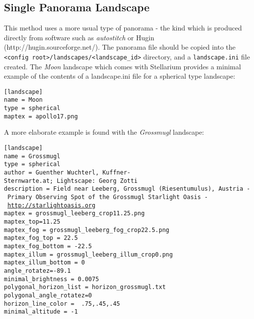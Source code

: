 \subsection{Single Panorama Landscape}\label{single-panorama-method}

This method uses a more usual type of panorama - the kind which is
produced directly from software such as \emph{autostitch} or Hugin
(http://hugin.sourceforge.net/). The panorama file should be copied into
the
\texttt{\textless{}config\ root\textgreater{}/landscapes/\textless{}landscape\_id\textgreater{}}
directory, and a \texttt{landscape.ini} file created. The \emph{Moon}
landscape which comes with Stellarium provides a minimal example of the
contents of a landscape.ini file for a spherical type landscape:

\begin{config}
\texttt{{[}landscape{]}}\\
\texttt{name~=~Moon}\\
\texttt{type~=~spherical}\\
\texttt{maptex~=~apollo17.png}
\end{config}

A more elaborate example is found with the \emph{Grossmugl} landscape:

\begin{config}
\texttt{{[}landscape{]}}\\
\texttt{name~=~Grossmugl}\\
\texttt{type~=~spherical}\\
\texttt{author~=~Guenther~Wuchterl,~Kuffner-Sternwarte.at;~Lightscape:~Georg~Zotti}\\
\texttt{description~=~Field~near~Leeberg,~Grossmugl~(Riesentumulus),~Austria~-~Primary~Observing~Spot~of~the~Grossmugl~Starlight~Oasis~-~}\href{http://starlightoasis.org}{\texttt{http://starlightoasis.org}}\\
\texttt{maptex~=~grossmugl\_leeberg\_crop11.25.png}\\
\texttt{maptex\_top=11.25~}\\
\texttt{maptex\_fog~=~grossmugl\_leeberg\_fog\_crop22.5.png}\\
\texttt{maptex\_fog\_top~=~22.5}\\
\texttt{maptex\_fog\_bottom~=~-22.5}\\
\texttt{maptex\_illum~=~grossmugl\_leeberg\_illum\_crop0.png}\\
\texttt{maptex\_illum\_bottom~=~0}\\
\texttt{angle\_rotatez=-89.1}\\
\texttt{minimal\_brightness~=~0.0075}\\
\texttt{polygonal\_horizon\_list~=~horizon\_grossmugl.txt}\\
\texttt{polygonal\_angle\_rotatez=0}\\
\texttt{horizon\_line\_color~=~~.75,.45,.45}\\
\texttt{minimal\_altitude~=~-1}
\end{config}

